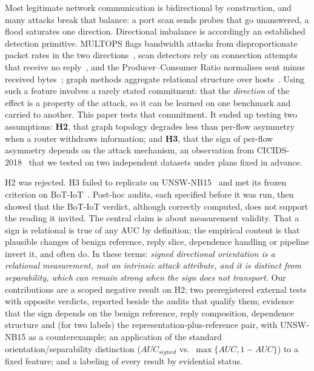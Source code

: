 \documentclass[preprint,12pt]{elsarticle}
\begin{document}
Most legitimate network communication is bidirectional by construction, and many attacks break that balance: a port scan sends probes that go unanswered, a flood saturates one direction. Directional imbalance is accordingly an established detection primitive. MULTOPS flags bandwidth attacks from disproportionate packet rates in the two directions~\cite{gil2001multops}, scan detectors rely on connection attempts that receive no reply~\cite{jung2004portscan}, and the Producer--Consumer Ratio normalises sent minus received bytes~\cite{bullard2014pcr}; graph methods aggregate relational structure over hosts~\cite{akoglu2015graph}. Using such a feature involves a rarely stated commitment: that the \emph{direction} of the effect is a property of the attack, so it can be learned on one benchmark and carried to another. This paper tests that commitment. It ended up testing two assumptions: \textbf{H2}, that graph topology degrades less than per-flow asymmetry when a router withdraws information; and \textbf{H3}, that the sign of per-flow asymmetry depends on the attack mechanism, an observation from CICIDS-2018~\cite{sharafaldin2018cicids} that we tested on two independent datasets under plans fixed in advance.

H2 was rejected. H3 failed to replicate on UNSW-NB15~\cite{moustafa2015unsw} and met its frozen criterion on BoT-IoT~\cite{koroniotis2019botiot}. Post-hoc audits, each specified before it was run, then showed that the BoT-IoT verdict, although correctly computed, does not support the reading it invited. The central claim is about measurement validity. That a sign is relational is true of any AUC by definition; the empirical content is that plausible changes of benign reference, reply slice, dependence handling or pipeline invert it, and often do. In these terms: \emph{signed directional orientation is a relational measurement, not an intrinsic attack attribute, and it is distinct from separability, which can remain strong when the sign does not transport.} Our contributions are a scoped negative result on H2; two preregistered external tests with opposite verdicts, reported beside the audits that qualify them; evidence that the sign depends on the benign reference, reply composition, dependence structure and (for two labels) the representation-plus-reference pair, with UNSW-NB15 as a counterexample; an application of the standard orientation/separability distinction ($AUC_{signed}$ vs.\ $\max\{AUC,1-AUC\}$) to a fixed feature; and a labeling of every result by evidential status.
\end{document}
